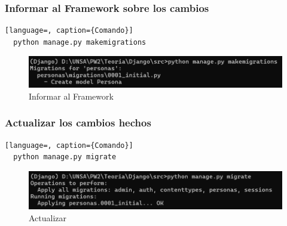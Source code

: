 \documentclass{article}
\begin{document}
  
  \subsubsection{Informar al Framework sobre los cambios}
  \begin{lstlisting}[language=, caption={Comando}]
  python manage.py makemigrations
  \end{lstlisting}
  \begin{figure}[H]
    \centering
    \includegraphics[width=1\textwidth, keepaspectratio]{img/informar.png}
    \caption{Informar al Framework}
  \end{figure}
  \newpage
  
  
  \subsubsection{Actualizar los cambios hechos}
  \begin{lstlisting}[language=, caption={Comando}]
  python manage.py migrate
  \end{lstlisting}
  \begin{figure}[H]
    \centering
    \includegraphics[width=1\textwidth, keepaspectratio]{img/actualizar.png}
    \caption{Actualizar}
  \end{figure}
  
\end{document}
